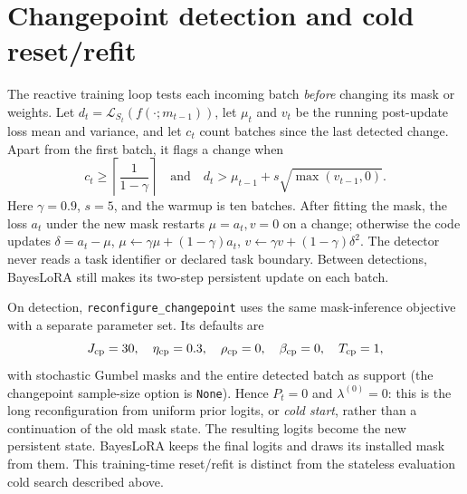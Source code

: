 \documentclass[11pt]{article}
\newcommand{\loss}{\mathcal{L}}
\begin{document}
\section{Changepoint detection and cold reset/refit}
The reactive training loop tests each incoming batch \emph{before} changing
its mask or weights. Let $d_t=\loss_{S_t}(f(\cdot;m_{t-1}))$, let $\mu_t$ and
$v_t$ be the running post-update loss mean and variance, and let $c_t$ count
batches since the last detected change. Apart from the first batch, it flags
a change when
\begin{equation}
 c_t\geq \left\lceil\frac{1}{1-\gamma}\right\rceil
 \quad\text{and}\quad
 d_t>\mu_{t-1}+s\sqrt{\max(v_{t-1},0)}.
 \label{eq:detector}
\end{equation}
Here $\gamma=0.9$, $s=5$, and the warmup is ten batches. After fitting the
mask, the loss $a_t$ under the new mask restarts $\mu=a_t,v=0$ on a change;
otherwise the code updates
$\delta=a_t-\mu$, $\mu\leftarrow\gamma\mu+(1-\gamma)a_t$,
$v\leftarrow\gamma v+(1-\gamma)\delta^2$. The detector never reads a task
identifier or declared task boundary. Between detections, BayesLoRA still
makes its two-step persistent update on each batch.

On detection, \texttt{reconfigure\_changepoint} uses the same mask-inference
objective with a separate parameter set. Its defaults are
\begin{equation}
 J_{\rm cp}=30,\quad \eta_{\rm cp}=0.3,\quad
 \rho_{\rm cp}=0,\quad\beta_{\rm cp}=0,\quad T_{\rm cp}=1,
 \label{eq:cp}
\end{equation}
with stochastic Gumbel masks and the entire detected batch as support
(the changepoint sample-size option is \texttt{None}). Hence
$P_t=0$ and $\lambda^{(0)}=0$: this is the long reconfiguration from
uniform prior logits, or \emph{cold start}, rather than a continuation of
the old mask state. The resulting logits become the new persistent state.
BayesLoRA keeps the final logits and draws its installed mask from them.
This training-time reset/refit is distinct from the stateless evaluation
cold search described above.

\clearpage
\end{document}

